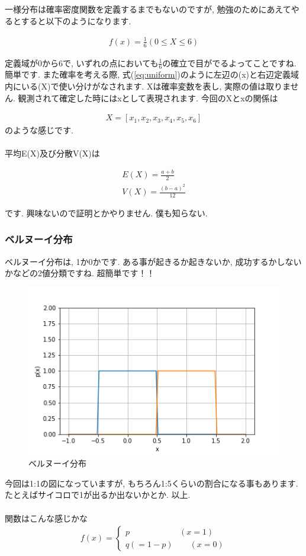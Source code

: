 \documentclass[11pt,a4paper,uplatex]{ujreport} 	%
\begin{document}
一様分布は確率密度関数を定義するまでもないのですが, 勉強のためにあえてやるとすると以下のようになります.

\begin{eqnarray}
\label{eq:uniform}
f(x) = \frac{1}{6} (0 \leq X \leq 6)
\end{eqnarray}

定義域が0から6で, いずれの点においても$\frac{1}{6}$の確立で目がでるよってことですね. 簡単です. また確率を考える際, 式(\ref{eq:uniform})のように左辺の(x)と右辺定義域内にいる(X)で使い分けがなされます. Xは確率変数を表し, 実際の値は取りません. 観測されて確定した時にはxとして表現されます. 今回のXとxの関係は

\begin{eqnarray}
X = [x_1, x_2, x_3, x_4, x_5, x_6]
\end{eqnarray}
のような感じです. \\
\\
平均E(X)及び分散V(X)は

\begin{eqnarray}
E(X) = \frac{a+b}{2}\\
V(X) = \frac{(b-a)^2}{12}
\end{eqnarray}

です. 興味ないので証明とかやりません. 僕も知らない.
\subsubsection{ベルヌーイ分布}
ベルヌーイ分布は, 1か0かです. ある事が起きるか起きないか, 成功するかしないかなどの2値分類ですね. 超簡単です！！\\

\begin{figure}[H]
\label{im:bernoulli}
  \centering
  \includegraphics[width=120mm,bb=0 0 432 288]{figures/bernoulli.png}
  \caption{ベルヌーイ分布}
\end{figure}
今回は1:1の図になっていますが, もちろん1:5くらいの割合になる事もあります. たとえばサイコロで1が出るか出ないかとか. 以上.\\
\\
関数はこんな感じかな
\begin{eqnarray}
f(x)=
  \left\{
    \begin{array}{l}
      p \qquad \qquad \qquad (x = 1) \\
      q(=1-p)  \qquad (x=0)
    \end{array}
  \right.
\end{eqnarray}
\end{document}
